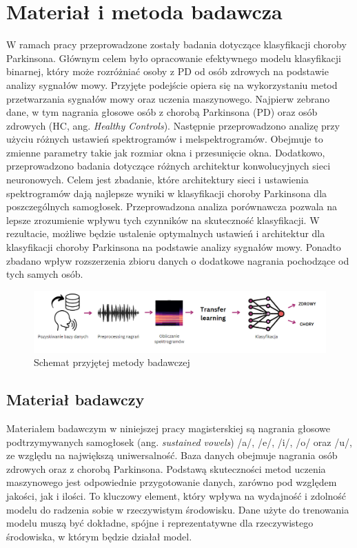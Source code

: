 \chapter{Materiał i metoda badawcza}

W ramach pracy przeprowadzone zostały badania dotyczące klasyfikacji choroby Parkinsona.
Głównym celem było opracowanie efektywnego modelu klasyfikacji binarnej, który może rozróżniać
osoby z PD od osób zdrowych na podstawie analizy sygnałów mowy.
Przyjęte podejście opiera się na wykorzystaniu metod przetwarzania sygnałów mowy oraz
uczenia maszynowego. Najpierw zebrano dane, w tym nagrania głosowe osób z chorobą Parkinsona
(PD) oraz osób zdrowych (HC, ang. \emph{Healthy Controls}). Następnie przeprowadzono analizę przy użyciu różnych ustawień
spektrogramów i melspektrogramów. Obejmuje to zmienne parametry takie jak rozmiar okna i
przesunięcie okna. Dodatkowo, przeprowadzono badania dotyczące różnych architektur
konwolucyjnych sieci neuronowych. Celem jest zbadanie, które architektury sieci i ustawienia
spektrogramów dają najlepsze wyniki w klasyfikacji choroby Parkinsona dla poszczególnych
samogłosek. Przeprowadzona analiza porównawcza pozwala na lepsze zrozumienie wpływu tych
czynników na skuteczność klasyfikacji. W rezultacie, możliwe będzie ustalenie optymalnych ustawień i
architektur dla klasyfikacji choroby Parkinsona na podstawie analizy sygnałów mowy. Ponadto zbadano
wpływ rozszerzenia zbioru danych o dodatkowe nagrania pochodzące od tych samych osób.

\begin{figure}[htbp]
	\centering
	\includegraphics[width=1\textwidth]{./img/methodology}
	\caption{Schemat przyjętej metody badawczej}
    \label{fig:methodology}
\end{figure}


\section{Materiał badawczy}
\label{sec:material-badawczy}

Materiałem badawczym w niniejszej pracy magisterskiej są nagrania głosowe podtrzymywanych samogłosek (ang. \emph{sustained vowels}) /a/, /e/, /i/, /o/ oraz /u/, ze względu na największą uniwersalność.
Baza danych obejmuje nagrania osób zdrowych oraz z chorobą Parkinsona.
Podstawą skuteczności metod uczenia maszynowego jest odpowiednie przygotowanie danych, zarówno pod względem jakości, jak i ilości.
To kluczowy element, który wpływa na wydajność i zdolność modelu do radzenia sobie w rzeczywistym środowisku.
Dane użyte do trenowania modelu muszą być dokładne, spójne i reprezentatywne dla rzeczywistego środowiska, w którym będzie działał model.

